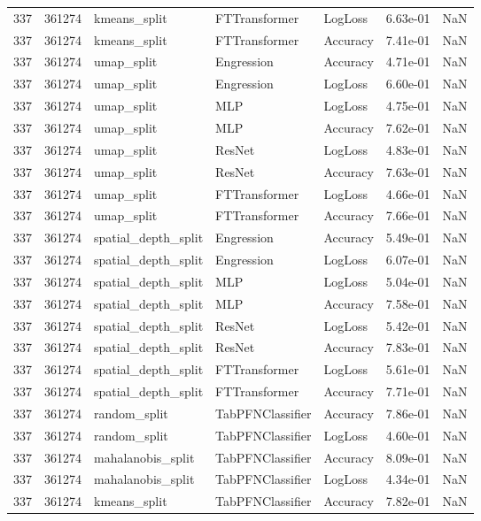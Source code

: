 \begin{tabular}{rrlllrr}
337 & 361274 & kmeans\_split & FTTransformer & LogLoss & 6.63e-01 & NaN \\
337 & 361274 & kmeans\_split & FTTransformer & Accuracy & 7.41e-01 & NaN \\
337 & 361274 & umap\_split & Engression & Accuracy & 4.71e-01 & NaN \\
337 & 361274 & umap\_split & Engression & LogLoss & 6.60e-01 & NaN \\
337 & 361274 & umap\_split & MLP & LogLoss & 4.75e-01 & NaN \\
337 & 361274 & umap\_split & MLP & Accuracy & 7.62e-01 & NaN \\
337 & 361274 & umap\_split & ResNet & LogLoss & 4.83e-01 & NaN \\
337 & 361274 & umap\_split & ResNet & Accuracy & 7.63e-01 & NaN \\
337 & 361274 & umap\_split & FTTransformer & LogLoss & 4.66e-01 & NaN \\
337 & 361274 & umap\_split & FTTransformer & Accuracy & 7.66e-01 & NaN \\
337 & 361274 & spatial\_depth\_split & Engression & Accuracy & 5.49e-01 & NaN \\
337 & 361274 & spatial\_depth\_split & Engression & LogLoss & 6.07e-01 & NaN \\
337 & 361274 & spatial\_depth\_split & MLP & LogLoss & 5.04e-01 & NaN \\
337 & 361274 & spatial\_depth\_split & MLP & Accuracy & 7.58e-01 & NaN \\
337 & 361274 & spatial\_depth\_split & ResNet & LogLoss & 5.42e-01 & NaN \\
337 & 361274 & spatial\_depth\_split & ResNet & Accuracy & 7.83e-01 & NaN \\
337 & 361274 & spatial\_depth\_split & FTTransformer & LogLoss & 5.61e-01 & NaN \\
337 & 361274 & spatial\_depth\_split & FTTransformer & Accuracy & 7.71e-01 & NaN \\
337 & 361274 & random\_split & TabPFNClassifier & Accuracy & 7.86e-01 & NaN \\
337 & 361274 & random\_split & TabPFNClassifier & LogLoss & 4.60e-01 & NaN \\
337 & 361274 & mahalanobis\_split & TabPFNClassifier & Accuracy & 8.09e-01 & NaN \\
337 & 361274 & mahalanobis\_split & TabPFNClassifier & LogLoss & 4.34e-01 & NaN \\
337 & 361274 & kmeans\_split & TabPFNClassifier & Accuracy & 7.82e-01 & NaN \\

\end{tabular}
